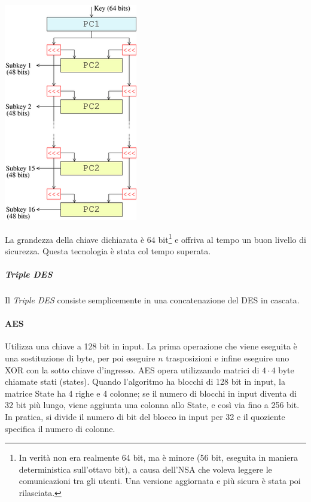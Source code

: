 \begin{center}
  \includegraphics[scale=0.5]{res/img/des.png}
\label{fig:password:des}
\end{center}

La grandezza della chiave dichiarata è 64 bit\footnote{In verità non era
realmente 64 bit, ma è minore (56 bit, eseguita in maniera deterministica
sull'ottavo bit), a causa dell'NSA che voleva leggere le comunicazioni tra gli
utenti. Una versione aggiornata e più sicura è stata poi rilasciata.} e offriva
al tempo un buon livello di sicurezza. Questa tecnologia è stata col tempo
superata.

\subparagraph*{Triple DES}

Il \textit{Triple DES} consiste semplicemente in una concatenazione del DES in
cascata.

\paragraph{AES}

Utilizza una chiave a 128 bit in input. La prima operazione che viene eseguita è
una sostituzione di byte, per poi eseguire $n$ trasposizioni e infine eseguire
uno XOR con la sotto chiave d'ingresso.
AES opera utilizzando matrici di $4\cdot4$ byte chiamate stati (states). Quando l'algoritmo ha blocchi di 128 bit in input, la matrice State ha 4 righe e 4 colonne; se il numero di blocchi in input diventa di 32 bit più lungo, viene aggiunta una colonna allo State, e così via fino a 256 bit. In pratica, si divide il numero di bit del blocco in input per 32 e il quoziente specifica il numero di colonne.


